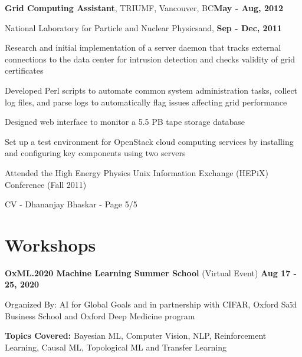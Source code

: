 \documentclass[margin,line]{res}
\newenvironment{list1}{
  \begin{list}{\ding{113}}{
      \setlength{\itemsep}{0in}
      \setlength{\parsep}{0in} \setlength{\parskip}{0in}
      \setlength{\topsep}{0in} \setlength{\partopsep}{0in}
      \setlength{\leftmargin}{0.17in}}}{\end{list}}
\newenvironment{list3}{
  \begin{list}{\textopenbullet}{
      \setlength{\itemsep}{0in}
      \setlength{\parsep}{0in} \setlength{\parskip}{0in}
      \setlength{\topsep}{0in} \setlength{\partopsep}{0in}
      \setlength{\leftmargin}{0.1in}}}{\end{list}}
\begin{document}
\begin{resume}
{\bf Grid Computing Assistant}, TRIUMF, Vancouver, BC\hfill{\bf May - Aug, 2012}\\
\vspace*{-.2cm}
\begin{list1}
\item[] National Laboratory for Particle and Nuclear Physics\hfill and, {\bf Sep - Dec, 2011}
\item[]
\vspace*{.2cm}
\begin{list3}
\setlength\itemsep{0.5em}
\item Research and initial implementation of a server daemon that tracks external connections to the data center for intrusion detection and checks validity of grid certificates
\item Developed Perl scripts to automate common system administration tasks, collect log files, and parse logs to automatically flag issues affecting grid performance
\item Designed web interface to monitor a 5.5 PB tape storage database
\item Set up a test environment for OpenStack cloud computing services by installing and configuring key components using two servers
\item Attended the High Energy Physics Unix Information Exchange (HEPiX) Conference (Fall 2011)
\end{list3}
\end{list1}

\newpage
\begin{flushright}
CV - Dhananjay Bhaskar - Page 5/5
\end{flushright}
\vspace*{.2cm}

\section{\sc Workshops}

{\bf OxML.2020 Machine Learning Summer School} (Virtual Event) \hfill {\bf Aug 17 - 25, 2020}\\
\vspace*{-.2cm}
\begin{list1}
\item[] Organized By: AI for Global Goals and in partnership with CIFAR, Oxford Sa\"{i}d Business School and Oxford Deep Medicine program
\vspace*{0.2cm}
\item[] {\bf Topics Covered:} Bayesian ML, Computer Vision, NLP, Reinforcement Learning, Causal ML, Topological ML and Transfer Learning
\end{list1}


\end{resume}
\end{document}
